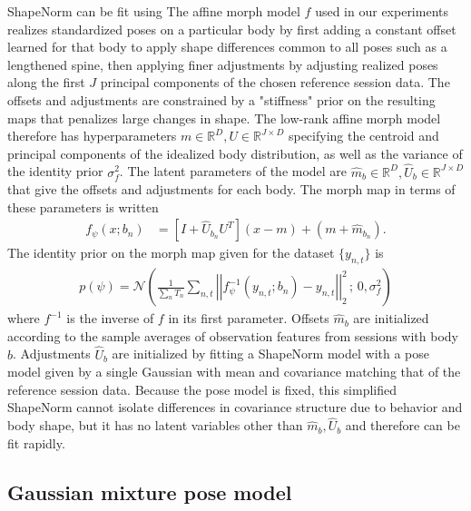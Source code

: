 \documentclass{article}         %
\newcommand{\inv}{^{-1}}
\newcommand{\RR}{\mathbb{R}}
\newcommand{\bc}[1]{\left[ #1 \right]}
\begin{document}
ShapeNorm can be fit using 
The affine morph model $f$ used in our experiments realizes standardized poses on a particular body by first adding a constant offset learned for that body to apply shape differences common to all poses such as a lengthened spine, then applying finer adjustments by adjusting realized poses along the first $J$ principal components of the chosen reference session data. The offsets and adjustments are constrained by a "stiffness" prior on the resulting maps that penalizes large changes in shape. The low-rank affine morph model therefore has hyperparameters $m\in \RR^D, U\in \RR^{J\times D}$ specifying the centroid and principal components of the idealized body distribution, as well as the variance of the identity prior $\sigma_{f}^2$. The latent parameters of the model are $\hat m_b\in \RR^D, \hat U_b\in \RR^{J\times D}$ that give the offsets and adjustments for each body. The morph map in terms of these parameters is written
\begin{align*}
    f_\psi(x; b_n) &= \bc{I + \hat{U}_{b_n} U^T} (x - m) + (m + \hat{m}_{b_n}).
\end{align*}
The identity prior on the morph map given for the dataset $\{y_{n, t}\}$ is
\begin{align*}
    p(\psi) = \mathcal{N}\left(
        \frac{1}{\sum_{n}T_n} \sum_{n, t} \left|\left| f_\psi\inv(y_{n, t}; b_n) - y_{n, t} \right|\right|_2^2 \,;\,
        0, \sigma_f^2
    \right)
\end{align*}
where $f\inv$ is the inverse of $f$ in its first parameter. Offsets $\hat m_b$ are initialized according to the sample averages of observation features from sessions with body $b$. Adjustments $\hat U_b$ are initialized by fitting a ShapeNorm model with a pose model given by a single Gaussian with mean and covariance matching that of the reference session data. Because the pose model is fixed, this simplified ShapeNorm cannot isolate differences in covariance structure due to behavior and body shape, but it has no latent variables other than $\hat m_b, \hat U_b$ and therefore can be fit rapidly.




\subsection{Gaussian mixture pose model}
\label{sec:pose}
\end{document}

